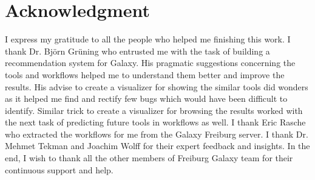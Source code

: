 \chapter*{Acknowledgment}

I express my gratitude to all the people who helped me finishing this work. I thank Dr. Björn Grüning who entrusted me with the task of building a recommendation system for Galaxy. His pragmatic suggestions concerning the tools and workflows helped me to understand them better and improve the results. His advise to create a visualizer for showing the similar tools did wonders as it helped me find and rectify few bugs which would have been difficult to identify. Similar trick to create a visualizer for browsing the results worked with the next task of predicting future tools in workflows as well. I thank Eric Rasche who extracted the workflows for me from the Galaxy Freiburg server. I thank Dr. Mehmet Tekman and Joachim Wolff for their expert feedback and insights. In the end, I wish to thank all the other members of Freiburg Galaxy team for their continuous support and help.

